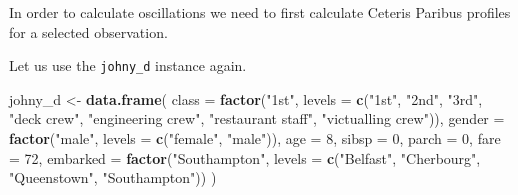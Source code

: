 \documentclass[12pt,]{krantz}
\newenvironment{Shaded}{\begin{snugshade}}{\end{snugshade}}
\newcommand{\DataTypeTok}[1]{\textcolor[rgb]{0.13,0.29,0.53}{#1}}
\newcommand{\DecValTok}[1]{\textcolor[rgb]{0.00,0.00,0.81}{#1}}
\newcommand{\KeywordTok}[1]{\textcolor[rgb]{0.13,0.29,0.53}{\textbf{#1}}}
\newcommand{\NormalTok}[1]{#1}
\newcommand{\OperatorTok}[1]{\textcolor[rgb]{0.81,0.36,0.00}{\textbf{#1}}}
\newcommand{\StringTok}[1]{\textcolor[rgb]{0.31,0.60,0.02}{#1}}
\theoremstyle{definition}
\theoremstyle{definition}
\theoremstyle{definition}
\theoremstyle{remark}
\begin{document}
\begin{Shaded}
\end{Shaded}

In order to calculate oscillations we need to first calculate Ceteris
Paribus profiles for a selected observation.

Let us use the \texttt{johny\_d} instance again.

\begin{Shaded}
\begin{Highlighting}[]
\NormalTok{johny_d <-}\StringTok{ }\KeywordTok{data.frame}\NormalTok{(}
  \DataTypeTok{class =} \KeywordTok{factor}\NormalTok{(}\StringTok{"1st"}\NormalTok{, }\DataTypeTok{levels =} \KeywordTok{c}\NormalTok{(}\StringTok{"1st"}\NormalTok{, }\StringTok{"2nd"}\NormalTok{, }\StringTok{"3rd"}\NormalTok{, }\StringTok{"deck crew"}\NormalTok{, }\StringTok{"engineering crew"}\NormalTok{, }
                                  \StringTok{"restaurant staff"}\NormalTok{, }\StringTok{"victualling crew"}\NormalTok{)),}
  \DataTypeTok{gender =} \KeywordTok{factor}\NormalTok{(}\StringTok{"male"}\NormalTok{, }\DataTypeTok{levels =} \KeywordTok{c}\NormalTok{(}\StringTok{"female"}\NormalTok{, }\StringTok{"male"}\NormalTok{)),}
  \DataTypeTok{age =} \DecValTok{8}\NormalTok{,}
  \DataTypeTok{sibsp =} \DecValTok{0}\NormalTok{,}
  \DataTypeTok{parch =} \DecValTok{0}\NormalTok{,}
  \DataTypeTok{fare =} \DecValTok{72}\NormalTok{,}
  \DataTypeTok{embarked =} \KeywordTok{factor}\NormalTok{(}\StringTok{"Southampton"}\NormalTok{, }\DataTypeTok{levels =} \KeywordTok{c}\NormalTok{(}\StringTok{"Belfast"}\NormalTok{, }\StringTok{"Cherbourg"}\NormalTok{, }\StringTok{"Queenstown"}\NormalTok{, }\StringTok{"Southampton"}\NormalTok{))}
\NormalTok{)}
\end{Highlighting}
\end{Shaded}
\end{document}
